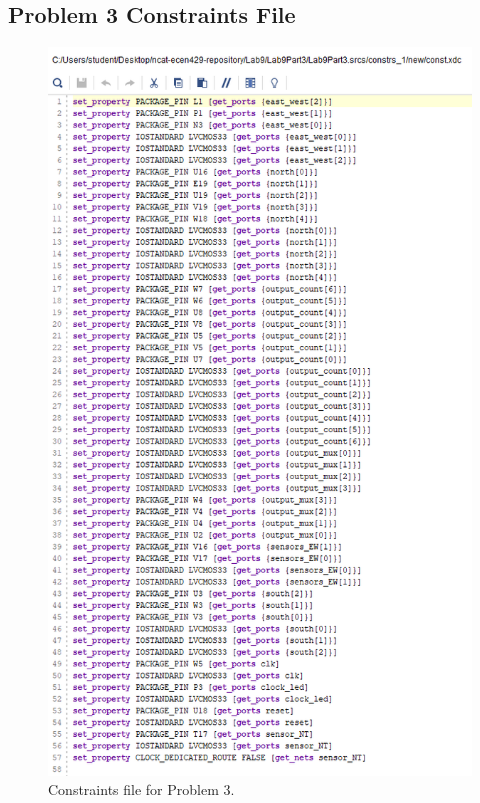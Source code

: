 \documentclass[11pt]{article}
\begin{document}
\begin{appendices}
\section{Problem 3 Constraints File}
\begin{center}
\begin{figure}[H]
	\includegraphics[scale=0.7]{./images/l9p3const.png}
	\caption{\label{fig:Prob3Const}Constraints file for Problem 3.}
\end{figure}
\end{center}

\end{appendices}
\end{document}
